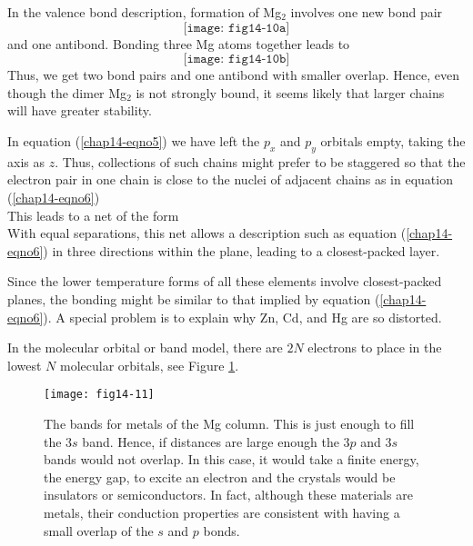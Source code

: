 In the valence bond description, formation of Mg$_2$ involves one new bond pair
\begin{equation}
\texttt{[image: fig14-10a]}
\end{equation}
and one antibond.  Bonding three Mg atoms together leads to
\begin{equation}
\texttt{[image: fig14-10b]}
\label{chap14-eqno5}
\end{equation}
Thus, we get two bond pairs and one antibond with smaller overlap.  Hence, 
even though the dimer Mg$_2$ is not strongly bound, it seems likely that 
larger chains will have greater stability.

In equation (\ref{chap14-eqno5}) we have left the $p_x$ and $p_y$
orbitals empty, taking the axis as $z$.  Thus, collections of such
chains might prefer to be staggered so that the electron pair in one
chain is close to the nuclei of adjacent chains as in equation
(\ref{chap14-eqno6})
\begin{equation}
\label{chap14-eqno6}
\end{equation}
This leads to a net of the form
\begin{equation}
\label{chap14-eqno7}
\end{equation}
With equal separations, this net allows a description such as equation
(\ref{chap14-eqno6}) in three directions within the plane, leading to
a closest-packed layer.

Since the lower temperature forms of all these elements involve
closest-packed planes, the bonding might be similar to that implied by
equation (\ref{chap14-eqno6}).  A special problem is to explain why
Zn, Cd, and Hg are so distorted.

In the molecular orbital or band model, there are $2N$ electrons to
place in the lowest $N$ molecular orbitals, see Figure
\ref{chap14-fig10}.

\begin{figure}
\texttt{[image: fig14-11]}
\caption{The bands for metals of the Mg column. This is just enough to
fill the $3s$ band.  Hence, if distances are large enough the $3p$ and
$3s$ bands would not overlap.  In this case, it would take a finite
energy, the energy gap, to excite an electron and the crystals would
be insulators or semiconductors.  In fact, although these materials
are metals, their conduction properties are consistent with having a
small overlap of the $s$ and $p$ bonds.} 
\label{chap14-fig10}
\end{figure}

